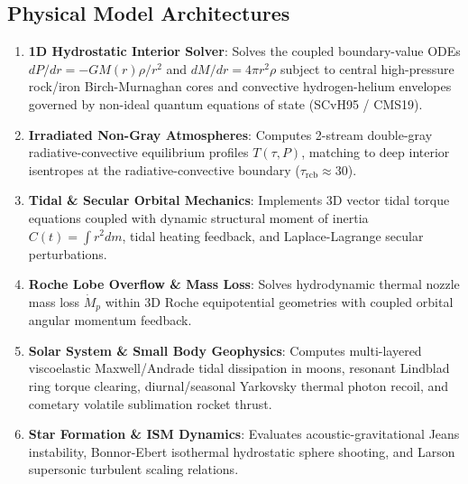 \documentclass[twocolumn,10pt,a4paper]{article}
\begin{document}
\subsection{Physical Model Architectures}
\begin{enumerate}
    \item \textbf{1D Hydrostatic Interior Solver}: Solves the coupled boundary-value ODEs $dP/dr = -G M(r) \rho / r^2$ and $dM/dr = 4\pi r^2 \rho$ subject to central high-pressure rock/iron Birch-Murnaghan cores and convective hydrogen-helium envelopes governed by non-ideal quantum equations of state (SCvH95 / CMS19).
    \item \textbf{Irradiated Non-Gray Atmospheres}: Computes 2-stream double-gray radiative-convective equilibrium profiles $T(\tau, P)$, matching to deep interior isentropes at the radiative-convective boundary ($\tau_{\text{rcb}} \approx 30$).
    \item \textbf{Tidal \& Secular Orbital Mechanics}: Implements 3D vector tidal torque equations coupled with dynamic structural moment of inertia $C(t) = \int r^2 dm$, tidal heating feedback, and Laplace-Lagrange secular perturbations.
    \item \textbf{Roche Lobe Overflow \& Mass Loss}: Solves hydrodynamic thermal nozzle mass loss $\dot{M}_p$ within 3D Roche equipotential geometries with coupled orbital angular momentum feedback.
    \item \textbf{Solar System \& Small Body Geophysics}: Computes multi-layered viscoelastic Maxwell/Andrade tidal dissipation in moons, resonant Lindblad ring torque clearing, diurnal/seasonal Yarkovsky thermal photon recoil, and cometary volatile sublimation rocket thrust.
    \item \textbf{Star Formation \& ISM Dynamics}: Evaluates acoustic-gravitational Jeans instability, Bonnor-Ebert isothermal hydrostatic sphere shooting, and Larson supersonic turbulent scaling relations.
\end{enumerate}
\end{document}
